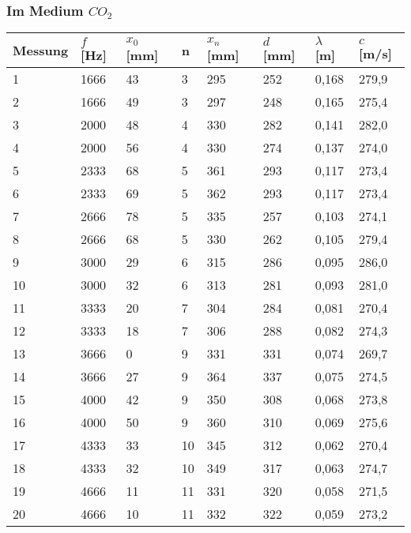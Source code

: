 \documentclass{scrartcl}
\begin{document}
\subsubsection{Im Medium $CO_{2}$}
\begin{table}[h]
\begin{tabular}{l|l|l|l|l|l|l|l}
Messung & $f$ {[}Hz{]} & $x_{0}$ [mm] & n & $x_{n}$ [mm] & $d$ [mm]   & $\lambda$ [m]      & $c$ [m/s]      \\
\hline
1       & 1666       & 43                & 3 & 295               & 252 & 0,168 & 279,9 \\
2       & 1666       & 49                & 3 & 297               & 248 & 0,165 & 275,4 \\
3       & 2000       & 48                & 4 & 330               & 282 & 0,141 & 282,0 \\
4       & 2000       & 56                & 4 & 330               & 274 & 0,137 & 274,0 \\
5       & 2333       & 68                & 5 & 361               & 293 & 0,117 & 273,4 \\
6       & 2333       & 69                & 5 & 362               & 293 & 0,117 & 273,4 \\
7       & 2666       & 78                & 5 & 335               & 257 & 0,103 & 274,1 \\
8       & 2666       & 68                & 5 & 330               & 262 & 0,105 & 279,4 \\
9       & 3000       & 29                & 6 & 315               & 286 & 0,095 & 286,0 \\
10      & 3000       & 32                & 6 & 313               & 281 & 0,093 & 281,0 \\
11      & 3333       & 20                & 7 & 304               & 284 & 0,081 & 270,4 \\
12      & 3333       & 18                & 7 & 306               & 288 & 0,082 & 274,3 \\
13      & 3666       &  0                & 9 & 331               & 331 & 0,074 & 269,7 \\
14      & 3666       & 27                & 9 & 364               & 337 & 0,075 & 274,5 \\
15      & 4000       & 42                & 9 & 350               & 308 & 0,068 & 273,8 \\
16      & 4000       & 50                & 9 & 360               & 310 & 0,069 & 275,6 \\
17      & 4333       & 33                & 10 & 345               & 312 & 0,062 & 270,4 \\
18      & 4333       & 32                & 10 & 349               & 317 & 0,063 & 274,7 \\
19      & 4666       & 11                & 11 & 331               & 320 & 0,058 & 271,5 \\
20      & 4666       & 10                & 11 & 332               & 322 & 0,059 & 273,2
\end{tabular}
\end{table}
\end{document}
